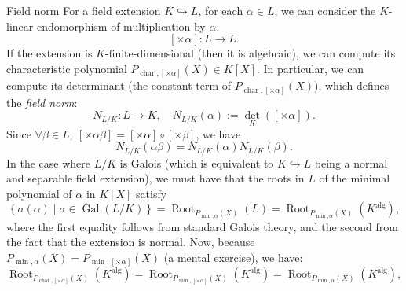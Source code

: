 \begin{appendixitem}{Field norm}
    For a field extension \( K \hookrightarrow L \), for each \( \alpha \in L \), we can consider the \( K \)-linear endomorphism of multiplication by \( \alpha \):
    \[
        \left[\times \alpha\right] : L \rightarrow L.
    \]
    If the extension is \( K \)-finite-dimensional (then it is algebraic), we can compute its characteristic polynomial \( P_{\operatorname{char}, \left[\times \alpha\right]}\left(X\right) \in K\left[X\right] \). In particular, we can compute its determinant (the constant term of \( P_{\operatorname{char}, \left[\times \alpha\right]}\left(X\right) \)), which defines the \textit{field norm}:
    \[
        N_{L/K} : L \rightarrow K, \quad N_{L/K}\left(\alpha\right) := {\det}_{K}\left(\left[\times \alpha\right]\right).
    \]
    Since \( \forall \beta \in L,\ \left[\times \alpha \beta\right] = \left[\times \alpha\right] \circ \left[\times \beta\right] \), we have
    \[
        N_{L/K}\left(\alpha \beta\right) = N_{L/K}\left(\alpha\right) N_{L/K}\left(\beta\right).
    \]
    In the case where \( L/K \) is Galois (which is equivalent to \( K \hookrightarrow L \) being a normal and separable field extension), we must have that the roots in \( L \) of the minimal polynomial of \( \alpha \) in \( K\left[X\right] \) satisfy
    \[
        \left\{ \sigma\left(\alpha\right) \mid \sigma \in \operatorname{Gal}\left(L/K\right) \right\} = \operatorname{Root}_{P_{\min, \alpha}\left(X\right)}\left(L\right) = \operatorname{Root}_{P_{\min, \alpha}\left(X\right)}\left( K^{\mathrm{alg}} \right),
    \]
    where the first equality follows from standard Galois theory, and the second from the fact that the extension is normal. Now, because \( P_{\min, \alpha}\left(X\right) = P_{\min, \left[\times \alpha\right]}\left(X\right) \) (a mental exercise), we have:
    \[
        \operatorname{Root}_{P_{\operatorname{char}, \left[\times \alpha\right]}\left(X\right)}\left( K^{\mathrm{alg}} \right) = \operatorname{Root}_{P_{\min, \left[\times \alpha\right]}\left(X\right)}\left( K^{\mathrm{alg}} \right) = \operatorname{Root}_{P_{\min, \alpha}\left(X\right)}\left( K^{\mathrm{alg}} \right),
\]
\end{appendixitem}
